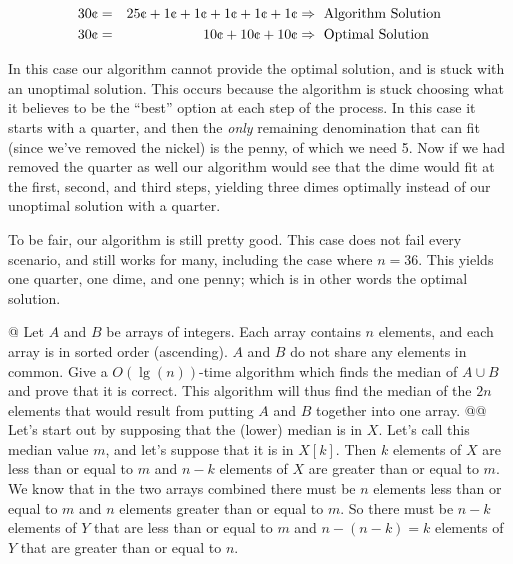 \documentclass[10pt]{article}
\begin{document}
\begin{easylist}[enumerate]
        \[ \begin{aligned}
            30 \cents &=& 25 \cents + 1 \cents + 1 \cents + 1 \cents + 1 \cents + 1 \cents &\Rightarrow \text{ Algorithm Solution}\\
            30 \cents &=& 10 \cents + 10 \cents + 10 \cents &\Rightarrow \text{ Optimal Solution}\\
        \end{aligned} \]

        In this case our algorithm cannot provide the optimal solution, and is stuck with an unoptimal solution. This
        occurs because the algorithm is stuck choosing what it believes to be the ``best'' option at each step of the
        process. In this case it starts with a quarter, and then the \textit{only} remaining denomination that can fit
        (since we've removed the nickel) is the penny, of which we need 5. Now if we had removed the quarter as well our
        algorithm would see that the dime would fit at the first, second, and third steps, yielding three dimes
        optimally instead of our unoptimal solution with a quarter.\newline

        To be fair, our algorithm is still pretty good. This case does not fail every scenario, and still works for
        many, including the case where $n=36$. This yields one quarter, one dime, and one penny; which is in other words
        the optimal solution.

    @ Let $A$ and $B$ be arrays of integers. Each array contains $n$ elements, and each array is in sorted order
    (ascending). $A$ and $B$ do not share any elements in common. Give a $O(\lg(n))$-time algorithm which finds the
    median of $A \cup B$ and prove that it is correct. This algorithm will thus find the median of the $2n$ elements
    that would result from putting $A$ and $B$ together into one array.
    @@ Let's start out by supposing that the (lower) median is in $X$. Let's call this median value $m$, and let's
    suppose that it is in $X[k]$. Then $k$ elements of $X$ are less than or equal to $m$ and $n - k$ elements of $X$ are
    greater than or equal to $m$. We know that in the two arrays combined there must be $n$ elements less than or equal
    to $m$ and $n$ elements greater than or equal to $m$. So there must be $n - k$ elements of $Y$ that are less than or
    equal to $m$ and $n - (n - k) = k$ elements of $Y$ that are greater than or equal to $n$.\newline


\end{easylist}
\end{document}
